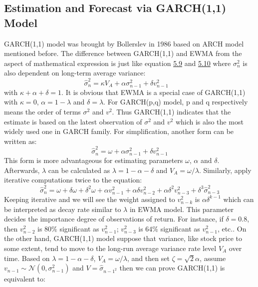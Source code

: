 \subsection{Estimation and Forecast via GARCH(1,1) Model}
GARCH(1,1) model was brought by Bollerslev \cite{16} in 1986 based on ARCH model mentioned before. The difference between GARCH(1,1) and EWMA from the aspect of mathematical expression is just like equation \hyperref[5.9]{5.9} and \hyperref[5.10]{5.10} where $\sigma_n^2$ is also dependent on long-term average variance:
\begin{equation}
\hat{\sigma}_n^2=\kappa V_A+\alpha\sigma_{n-1}^2+\delta v_{n-1}^2\quad
\end{equation} 
with $\kappa+\alpha+\delta=1$. It is obvious that EWMA is a special case of GARCH(1,1) with $\kappa=0$, $\alpha=1-\lambda$ and $\delta=\lambda$. For GARCH(p,q) model, p and q respectively means the order of terms $\sigma^2$ and $v^2$. Thus GARCH(1,1) indicates that the estimate is based on the latest observation of $\sigma^2$ and $v^2$ which is also the most widely used one in GARCH family. For simplification, another form can be written as:
\begin{equation}
\hat{\sigma}_n^2=\omega+\alpha\sigma_{n-1}^2+\delta v_{n-1}^2
\end{equation} 
This form is more advantageous for estimating parameters $\omega$, $\alpha$ and $\delta$. Afterwards, $\lambda$ can be calculated as $\lambda=1-\alpha-\delta$ and $V_A=\omega/\lambda$. Similarly, apply iterative computations twice to the equation:
\begin{equation}
\hat{\sigma}_n^2=\omega+\delta\omega+\delta^2\omega+\alpha v_{n-1}^2+\alpha\delta v_{n-2}^2+\alpha\delta^2v_{n-3}^2+\delta^3\hat{\sigma}_{n-3}^2
\end{equation} 
Keeping iterative and we will see the weight assigned to $v_{n-k}^2$ is $\alpha\delta^{k-1}$ which can be interpreted as decay rate similar to $\lambda$ in EWMA model. This parameter decides the importance degree of observations of return. For instance, if $\delta=0.8$, then $v_{n-2}^2$ is $80\%$ significant as $v_{n-1}^2$; $v_{n-3}^2$ is $64\%$ significant as $v_{n-1}^2$, etc.. On the other hand, GARCH(1,1) model suppose that variance, like stock price to some extent, tend to move to the long-run average variance rate level $V_A$ over time. Based on $\lambda=1-\alpha-\delta$, $V_A=\omega/\lambda$, and then set $\zeta=\sqrt{2}\alpha$, assume $v_{n-1}\sim\mathcal{N}(0,\sigma_{n-1}^2)$ and $V=\hat{\sigma}_{n-1^2}$ then we can prove GARCH(1,1) is equivalent to:
